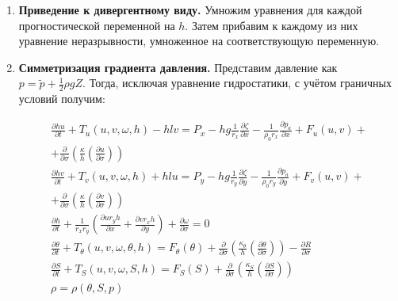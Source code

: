 	\begin{enumerate}
	\item  \textbf{Приведение к дивергентному виду. }
Умножим уравнения для каждой прогностической переменной на $h$. 
Затем прибавим к каждому из них уравнение неразрывности, умноженное на соответствующую переменную.

	\item  \textbf{Симметризация градиента давления.} 
	Представим давление как $p=\tilde{p}+\frac{1}{2} \rho gZ$. 
	Тогда, исключая уравнение гидростатики, с учётом граничных условий получим:

	\begin{equation} \label{eq:inmsom/4}
	\begin{array}{c} 
	\displaystyle{\frac{\partial hu}{\partial t} + T_{u} (u,v,\omega ,h) - h l v = P_{x} -hg\frac{1}{r_x}\frac{\partial \zeta }{\partial x} - \frac{1}{\rho_0 r_x}\frac{\partial p_a}{\partial x} + F_{u} (u,v) + } \\
	\displaystyle{+ \frac{\partial }{\partial \sigma } \left(\frac{\kappa }{h} \left(\frac{\partial u}{\partial \sigma } \right)\right)} \\
	
	\displaystyle{\frac{\partial hv}{\partial t} + T_{v} (u,v,\omega ,h) + h l u = P_{y} -hg\frac{1}{r_y}\frac{\partial \zeta }{\partial y} -\frac{1}{\rho_0 r_y}\frac{\partial p_a}{\partial y} + F_{v} (u,v) + } \\
	\displaystyle{+ \frac{\partial }{\partial \sigma } \left(\frac{\kappa }{h} \left(\frac{\partial v}{\partial \sigma } \right)\right)} \\ 
	
	\displaystyle{\frac{\partial h}{\partial t} +\frac{1}{r_{x} r_{y} } \left(\frac{\partial ur_{y} h}{\partial x} +\frac{\partial vr_{x} h}{\partial y} \right)+\frac{\partial \omega }{\partial \sigma } =0} \\ 
	
	\displaystyle{\frac{\partial \theta }{\partial t} + T_{\theta } (u,v,\omega ,\theta ,h) = F_{\theta } (\theta ) + \frac{\partial }{\partial \sigma } \left(\frac{\kappa _{\theta } }{h} \left(\frac{\partial \theta }{\partial \sigma } \right)\right) - \frac{\partial R}{\partial \sigma } } \\ 
	
	\displaystyle{\frac{\partial S}{\partial t} + T_{S} (u,v,\omega ,S,h) = F_{S} (S) + \frac{\partial }{\partial \sigma } \left(\frac{\kappa _{S} }{h} \left(\frac{\partial S}{\partial \sigma } \right) \right)} \\ 
	
	\displaystyle{\rho =\rho (\theta ,S,p)} 
	\end{array} 
	\end{equation} 
	
	\end{enumerate}

